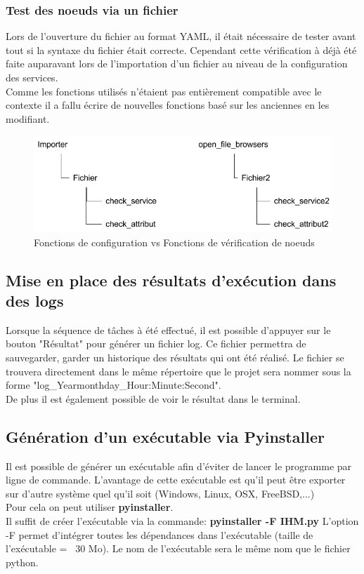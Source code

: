 \documentclass[a4paper,11pt]{article}
\begin{document}
\subsubsection{Test des noeuds via un fichier}
\noindent
Lors de l'ouverture du fichier au format YAML, il était nécessaire de tester avant tout si la syntaxe du fichier était correcte. Cependant cette vérification à déjà été faite auparavant lors de l'importation d'un fichier au niveau de la configuration des services.\\
Comme les fonctions utilisés n’étaient pas entièrement compatible avec le contexte il a fallu écrire de nouvelles fonctions basé sur les anciennes en les modifiant.\\
\begin{figure}[hbtp]
\centering
\includegraphics[scale=0.5]{difference_importer_openfile.png}
\caption{Fonctions de configuration vs Fonctions de vérification de noeuds}
\end{figure}



\subsection{Mise en place des résultats d'exécution dans des logs}
\noindent
Lorsque la séquence de tâches à été effectué, il est possible d'appuyer sur le bouton "Résultat" pour générer un fichier log. Ce fichier permettra de sauvegarder, garder un historique des résultats qui ont été réalisé. Le fichier se trouvera directement dans le même répertoire que le projet sera nommer sous la forme "log\_Year\-month\-day\_Hour:Minute:Second".\\
De plus il est également possible de voir le résultat dans le terminal.	

\subsection{Génération d'un exécutable via Pyinstaller}
\noindent
Il est possible de générer un exécutable afin d'éviter de lancer le programme par ligne de commande. L'avantage de cette exécutable est qu'il peut être exporter sur d'autre système quel qu'il soit (Windows, Linux, OSX, FreeBSD,...)
\\
Pour cela on peut utiliser \textbf{pyinstaller}.\\
Il suffit de créer l'exécutable via la commande: \textbf{pyinstaller -F IHM.py}\smallbreak
\noindent
L'option -F permet d'intégrer toutes les dépendances dans l'exécutable (taille de l'exécutable = ~30 Mo).
\smallbreak
\noindent
Le nom de l'exécutable sera le même nom que le fichier python.\\
\end{document}
